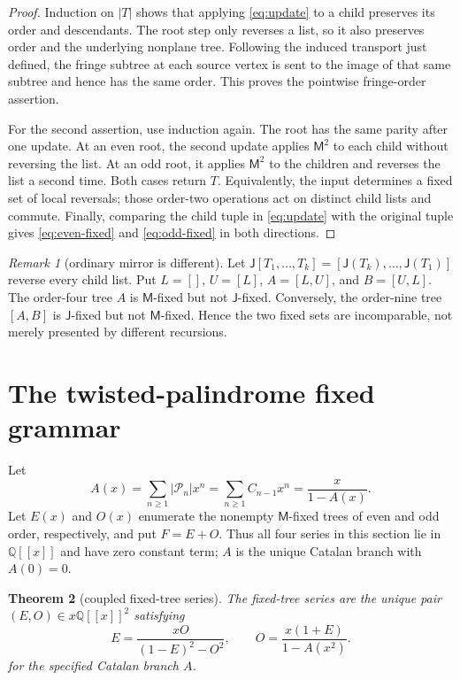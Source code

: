 \documentclass[10pt,a4paper]{amsart}
\newtheorem{theorem}{Theorem}[section]
\theoremstyle{definition}
\theoremstyle{remark}
\newtheorem{remark}[theorem]{Remark}
\newcommand{\PT}{\mathcal P}
\newcommand{\M}{\mathsf M}
\newcommand{\J}{\mathsf J}
\begin{document}
\begin{proof}
Induction on $|T|$ shows that applying \eqref{eq:update} to a child preserves
its order and descendants.  The root step only reverses a list, so it also
preserves order and the underlying nonplane tree.  Following the induced
transport just defined, the fringe subtree at each source vertex is sent to
the image of that same subtree and hence has the same order.  This proves the
pointwise fringe-order assertion.

For the second assertion, use induction again.  The root has the same parity
after one update.  At an even root, the second update applies $\M^2$ to each
child without reversing the list.  At an odd root, it applies $\M^2$ to the
children and reverses the list a second time.  Both cases return $T$.
Equivalently, the input determines a fixed set of local reversals; those
order-two operations act on distinct child lists and commute.  Finally,
comparing the child tuple in \eqref{eq:update} with the original tuple gives
\eqref{eq:even-fixed} and \eqref{eq:odd-fixed} in both directions.
\end{proof}

\begin{remark}[ordinary mirror is different]\label{rem:mirror}
Let $\J[T_1,\ldots,T_k]=[\J(T_k),\ldots,\J(T_1)]$ reverse every child list.
Put $L=[]$, $U=[L]$, $A=[L,U]$, and $B=[U,L]$.  The order-four tree $A$ is
$\M$-fixed but not $\J$-fixed.  Conversely, the order-nine tree $[A,B]$ is
$\J$-fixed but not $\M$-fixed.  Hence the two fixed sets are incomparable,
not merely presented by different recursions.
\end{remark}

\section{The twisted-palindrome fixed grammar}\label{sec:grammar}

Let
\[
 A(x)=\sum_{n\geq1}|\PT_n|x^n
     =\sum_{n\geq1}C_{n-1}x^n
     =\frac{x}{1-A(x)}.
\]
Let $E(x)$ and $O(x)$ enumerate the nonempty $\M$-fixed trees of even and
odd order, respectively, and put $F=E+O$.  Thus all four series in this
section lie in $\mathbb Q[[x]]$ and have zero constant term; $A$ is the
unique Catalan branch with $A(0)=0$.

\begin{theorem}[coupled fixed-tree series]\label{thm:coupled}
The fixed-tree series are the unique pair $(E,O)\in x\mathbb Q[[x]]^2$
satisfying
\begin{equation}\label{eq:coupled}
\boxed{
 E=\frac{xO}{(1-E)^2-O^2},
 \qquad
 O=\frac{x(1+E)}{1-A(x^2)}.}
\end{equation}
for the specified Catalan branch $A$.
\end{theorem}
\end{document}
